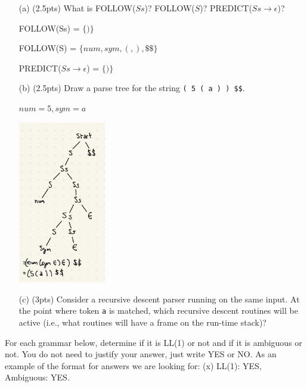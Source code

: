 \documentclass[11pt]{amsart}
\begin{document}
\begin{enumerate}

\item[(a)] (2.5pts) What is FOLLOW($Ss$)? FOLLOW($S$)? PREDICT($Ss \rightarrow \epsilon$)?

\vspace{0.25cm}

FOLLOW(Ss) = $\{ ) \}$

FOLLOW(S) = $\{ num, sym, (, ), \$\$ \}$

PREDICT($Ss \rightarrow \epsilon$) = $\{ ) \}$

\vspace{0.25cm}

\item[(b)] (2.5pts) Draw a parse tree for the string \texttt{( 5 ( a ) ) \$\$}. 

\vspace{0.25cm}

$num = 5, sym = a$

\vspace{.25cm}

\begin{center}
    \includegraphics[width=0.3\textwidth]{IMG_0082.jpg}
\end{center}

\item[(c)] (3pts) Consider a recursive descent parser running on the same input. At the point
where token \texttt{a} is matched, which recursive descent routines will be 
active (i.e., what routines will have a frame on the run-time stack)?

\end{enumerate}

\vspace{.15in}

\newpage

 For each grammar below, determine if it is LL(1) or not and if it is ambiguous or not. You do not need to justify your answer, just write YES or NO. As an example of the format for answers we are looking for: (x) LL(1): YES, Ambiguous: YES.
\end{document}
